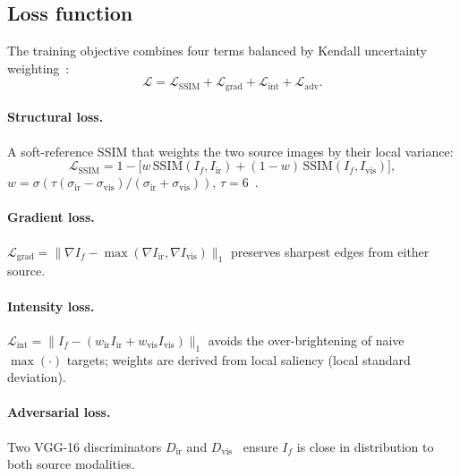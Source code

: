 \documentclass[a4paper,fleqn]{cas-dc}
\begin{document}
\subsection{Loss function}
\label{sec:method:loss}

The training objective combines four terms balanced by Kendall uncertainty
weighting~\cite{kendall2018}:
\begin{equation}
  \mathcal{L} =
    \mathcal{L}_\mathrm{SSIM}
    + \mathcal{L}_\mathrm{grad}
    + \mathcal{L}_\mathrm{int}
    + \mathcal{L}_\mathrm{adv}.
  \label{eq:loss}
\end{equation}

\paragraph{Structural loss.}
A soft-reference SSIM that weights the two source images by their local
variance:
\begin{equation}
  \mathcal{L}_\mathrm{SSIM}
    = 1 - \bigl[w\,\mathrm{SSIM}(I_f,I_\mathrm{ir})
               +(1-w)\,\mathrm{SSIM}(I_f,I_\mathrm{vis})\bigr],
  \label{eq:ssim}
\end{equation}
$w = \sigma(\tau(\sigma_\mathrm{ir}-\sigma_\mathrm{vis})/(\sigma_\mathrm{ir}+\sigma_\mathrm{vis}))$,
$\tau=6$~\cite{ssim2004}.

\paragraph{Gradient loss.}
$\mathcal{L}_\mathrm{grad}
  = \|\nabla I_f - \max(\nabla I_\mathrm{ir},\nabla I_\mathrm{vis})\|_1$
preserves sharpest edges from either source.

\paragraph{Intensity loss.}
$\mathcal{L}_\mathrm{int}
  = \|I_f - (w_\mathrm{ir}I_\mathrm{ir}+w_\mathrm{vis}I_\mathrm{vis})\|_1$
avoids the over-brightening of naive $\max(\cdot)$ targets; weights are
derived from local saliency (local standard deviation).

\paragraph{Adversarial loss.}
Two VGG-16 discriminators $D_\mathrm{ir}$ and $D_\mathrm{vis}$~\cite{vgg2015}
ensure $I_f$ is close in distribution to both source modalities.

\end{document}
